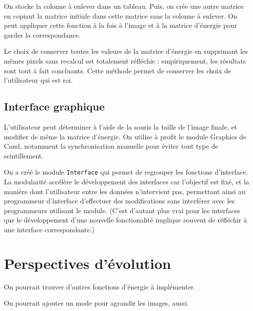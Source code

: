 \documentclass[a4paper]{article}
\begin{document}
On stocke la colonne à enlever dans un tableau. Puis, on crée une autre matrice en copiant la matrice initiale dans cette matrice sans la colonne à enlever. On peut appliquer cette fonction à la fois à l'image et à la matrice d'énergie pour garder la correspondance.

Le choix de conserver toutes les valeurs de la matrice d'énergie en supprimant les mêmes pixels sans recalcul est totalement réfléchie : empiriquement, les résultats sont tout à fait concluants. Cette méthode permet de conserver les choix de l'utilisateur qui est roi.


\subsection{Interface graphique}

L'utilisateur peut déterminer à l'aide de la souris la taille de l'image finale, et modifier de même la matrice d'énergie. On utilise à profit le module Graphics de Caml, notamment la synchronisation manuelle pour éviter tout type de scintillement.

On a créé le module {\tt Interface} qui permet de regrouper les fonctions d'interface. La modularité
accélère le développement des interfaces car l'objectif est fixé, et la manière dont l'utilisateur entre les données n'intervient pas, permettant ainsi au programmeur d'interface d'effectuer des modifications sans interférer avec les programmeurs utilisant le module. (C'est d'autant plus vrai pour les interfaces que le développement d'une nouvelle fonctionalité implique souvent de réfléchir à une interface correspondante.)

\section{Perspectives d'évolution}

On pourrait trouver d'autres fonctions d'énergie à implémenter.

On pourrait ajouter un mode pour agrandir les images, aussi.
\end{document}
